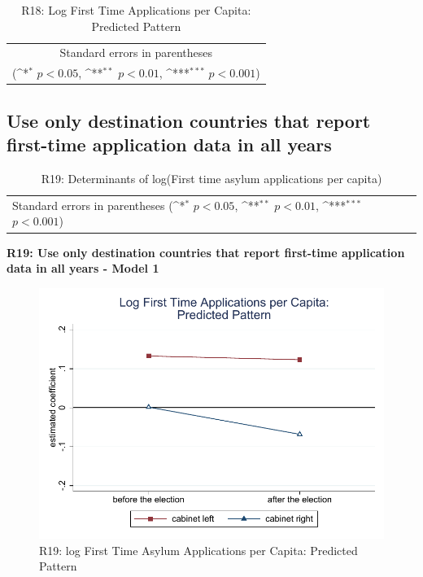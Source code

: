 \documentclass[10pt,a4paper]{scrartcl}
\begin{document}
\begin{table}[!ht]\centering
	\footnotesize
	\renewcommand{\arraystretch}{1.15}
	\def\sym#1{\ifmmode^{#1}\else\(^{#1}\)\fi}
	\caption{R18: Log First Time Applications per Capita: Predicted Pattern}
	\begin{tabular}{l*{2}{c}}
		\hline\hline
		
		\hline\hline
		\multicolumn{3}{c}{\footnotesize Standard errors in parentheses} \\
		\multicolumn{3}{c}{\footnotesize (\sym{*} \(p<0.05\), \sym{**} \(p<0.01\), \sym{***} \(p<0.001\))} \\
	\end{tabular}
\end{table}






\clearpage
\FloatBarrier
\subsection{Use only destination countries that report first-time application data in all years}
\begin{table}[!ht]\centering
	\renewcommand{\arraystretch}{1.25}
	\small
	\def\sym#1{\ifmmode^{#1}\else\(^{#1}\)\fi}
	\caption{R19: Determinants of log(First time asylum applications per capita)}
	\begin{tabular}{l*{3}{c}}
		\hline\hline
		
		\hline\hline
		\multicolumn{4}{l}{\footnotesize Standard errors in parentheses (\sym{*} \(p<0.05\), \sym{**} \(p<0.01\), \sym{***} \(p<0.001\))}\\
	\end{tabular}
\end{table}

\clearpage
\textbf{R19: Use only destination countries that report first-time application data in all years - Model 1}
\begin{figure}[!ht]
	\centering
	\includegraphics[width=1\textwidth]{figures_edited/app_graph1_R19.pdf}
	\caption{R19: log First Time Asylum Applications per Capita: Predicted Pattern}
\end{figure}
\end{document}

